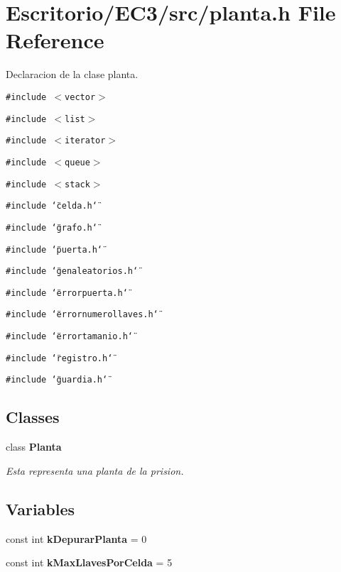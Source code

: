 \section{Escritorio/EC3/src/planta.h File Reference}
\label{planta_8h}
Declaracion de la clase planta. 

{\tt \#include $<$vector$>$}\par
{\tt \#include $<$list$>$}\par
{\tt \#include $<$iterator$>$}\par
{\tt \#include $<$queue$>$}\par
{\tt \#include $<$stack$>$}\par
{\tt \#include \char`\"{}celda.h\char`\"{}}\par
{\tt \#include \char`\"{}grafo.h\char`\"{}}\par
{\tt \#include \char`\"{}puerta.h\char`\"{}}\par
{\tt \#include \char`\"{}genaleatorios.h\char`\"{}}\par
{\tt \#include \char`\"{}errorpuerta.h\char`\"{}}\par
{\tt \#include \char`\"{}errornumerollaves.h\char`\"{}}\par
{\tt \#include \char`\"{}errortamanio.h\char`\"{}}\par
{\tt \#include \char`\"{}registro.h\char`\"{}}\par
{\tt \#include \char`\"{}guardia.h\char`\"{}}\par
\subsection*{Classes}
\begin{CompactItemize}
\item 
class {\bf Planta}
\begin{CompactList}\small\item\em Esta representa una planta de la prision. \item\end{CompactList}\end{CompactItemize}
\subsection*{Variables}
\begin{CompactItemize}
\item 
const int {\bf kDepurarPlanta} = 0
\item 
const int {\bf kMaxLlavesPorCelda} = 5
\end{CompactItemize}


